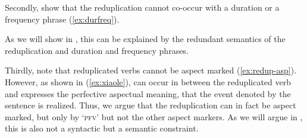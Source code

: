 \z  
\z

Secondly, \citet[319]{SuiHu2016} show that the reduplication cannot co-occur with a duration or a frequency phrase (\ref{ex:durfreq}).
\ea\label{ex:durfreq}

\z\z
As we will show in , this can be explained by the redundant semantics of the reduplication and duration and frequency phrases.

Thirdly, \citet[319]{SuiHu2016} note that reduplicated verbs cannot be aspect marked (\ref{ex:redup-asp}).
\ea\label{ex:redup-asp}
\z\z
However, as shown in (\ref{ex:xiaole}),  can occur in between the reduplicated verb
 and expresses the perfective aspectual meaning, that the event denoted by the sentence is realized.
Thus, we argue that the reduplication can in fact be aspect marked,
but only by  `\textsc{pfv}' but not the other aspect markers.
As we will argue in , this is also not a syntactic but a semantic constraint.

